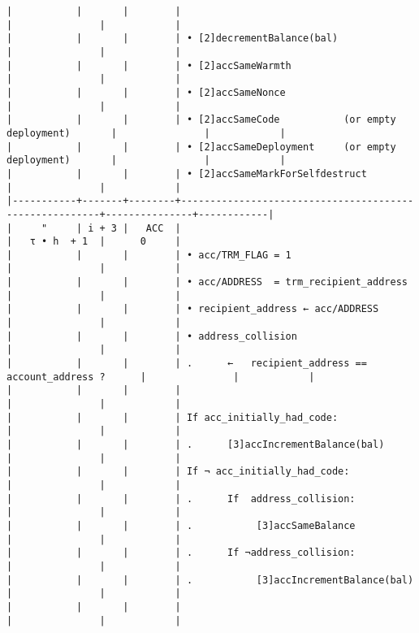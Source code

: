 \documentclass[varwidth=\maxdimen,margin=0.5cm,multi={verbatim}]{standalone}
\begin{document}
\begin{verbatim}
|           |       |        |                                                        |               |            |
|           |       |        | • [2]decrementBalance(bal)                             |               |            |
|           |       |        | • [2]accSameWarmth                                     |               |            |
|           |       |        | • [2]accSameNonce                                      |               |            |
|           |       |        | • [2]accSameCode           (or empty deployment)       |               |            |
|           |       |        | • [2]accSameDeployment     (or empty deployment)       |               |            |
|           |       |        | • [2]accSameMarkForSelfdestruct                        |               |            |
|-----------+-------+--------+--------------------------------------------------------+---------------+------------|
|     "     | i + 3 |   ACC  |                                                        |   τ • h  + 1  |      0     |
|           |       |        | • acc/TRM_FLAG = 1                                     |               |            |
|           |       |        | • acc/ADDRESS  = trm_recipient_address                 |               |            |
|           |       |        | • recipient_address ← acc/ADDRESS                      |               |            |
|           |       |        | • address_collision                                    |               |            |
|           |       |        | .      ←   recipient_address == account_address ?      |               |            |
|           |       |        |                                                        |               |            |
|           |       |        | If acc_initially_had_code:                             |               |            |
|           |       |        | .      [3]accIncrementBalance(bal)                     |               |            |
|           |       |        | If ¬ acc_initially_had_code:                           |               |            |
|           |       |        | .      If  address_collision:                          |               |            |
|           |       |        | .           [3]accSameBalance                          |               |            |
|           |       |        | .      If ¬address_collision:                          |               |            |
|           |       |        | .           [3]accIncrementBalance(bal)                |               |            |
|           |       |        |                                                        |               |            |

\end{verbatim}
\end{document}
